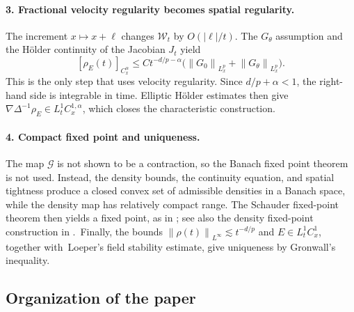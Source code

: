 \documentclass[11pt]{article}
\newcommand{\norm}[1]{\left\lVert #1\right\rVert}
\newcommand{\abs}[1]{\left\lvert #1\right\rvert}
\begin{document}
\paragraph{3. Fractional velocity regularity becomes spatial regularity.}
The increment $x\mapsto x+\ell$ changes $\mathcal W_t$ by
$O(\abs\ell/t)$.
The $G_\theta$ assumption and the H\"older continuity of the Jacobian
$J_t$ yield
\begin{equation}\label{key-estimate-intro}
 [\rho_E(t)]_{C^\alpha_x}
 \leq C t^{-d/p-\alpha}
 \bigl(\norm{G_0}_{L^p_x}+\norm{G_\theta}_{L^p_x}\bigr).
\end{equation}
This is the only step that uses velocity regularity.  Since
$d/p+\alpha<1$, the right-hand side is integrable in time.  Elliptic
H\"older estimates then give
$\nabla\Delta^{-1}\rho_E\in
L^1_tC^{1,\alpha}_x$, which closes the characteristic construction.

\paragraph{4. Compact fixed point and uniqueness.}
The map $\mathcal G$ is not shown to be a contraction, so the Banach fixed
point theorem is not used.  Instead, the density bounds, the continuity
equation, and spatial tightness produce a closed convex
set of admissible densities in a Banach space, while the density map has
relatively compact range.  The Schauder fixed-point theorem then yields a
fixed point, as in \cite[Section~4.1]{NguyenMemoir}; see also the density
fixed-point construction in \cite{Tae}.\ 
Finally, the bounds
$\norm{\rho(t)}_{L^\infty}\lesssim t^{-d/p}$ and
$E\in L^1_tC^1_x$, together with\ Loeper's field stability
estimate, give uniqueness by Gronwall's inequality.

\subsection{Organization of the paper}
\end{document}
